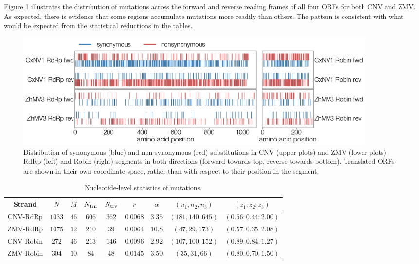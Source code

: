 \documentclass[unnumsec,webpdf,contemporary,large,namedate]{oup-authoring-template}%
\theoremstyle{thmstyleone}%
\theoremstyle{thmstyletwo}%
\theoremstyle{thmstylethree}%
\begin{document}
Figure \ref{fig: 2} illustrates the distribution of mutations across the forward and reverse reading frames
of all four ORFs for both CNV and ZMV. As expected, there is evidence that some regions accumulate mutations more readily than others.
The pattern is consistent with what would be expected from the statistical reductions in the tables.

\begin{figure}
\begin{center}
\includegraphics[width=0.9\textwidth]{narna-diversity.png}
\caption{\label{fig: 2}
Distribution of synonymous (blue) and non-synonymous (red) substitutions in CNV (upper plots) and ZMV (lower plots) RdRp (left) and Robin (right) segments in both directions (forward towards top, reverse towards bottom).
Translated ORFs are shown in their own coordinate space, rather than with respect to their position in the segment.
}
\end{center}
\end{figure}

\begin{table}
\centering
\begin{tabular}{|c|c|c|c|c|c|c|c|c|}
\hline
Strand&$N$&$M$&$N_{\rm trn}$&$N_{\rm trv}$&$r$&$\alpha$&$(n_1,n_2,n_3)$&$(z_1:z_2:z_3)$\\
\hline
CNV-RdRp&$1033$  &$46$ &$606$ &$362$&$0.0068$&$3.35$ &$(181,140,645)$&$(0.56:0.44:2.00)$\\
ZMV-RdRp&$1075$ &$12$&$210$ &$39$& $0.0064$ &$10.8$ &$(47,29,173)$&$(0.57:0.35:2.08)$\\
CNV-Robin&$272$    &$46$ &$213$ &$146$&$0.0096$&$2.92$ &$(107,100,152)$&$(0.89:0.84:1.27)$\\
ZMV-Robin&$304$&$10$&$84$&$48$&$0.0145$&$3.50$&$(35,31,66)$&$(0.80:0.70:1.50)$\\
\hline
\end{tabular}
\caption{
\centering
Nucleotide-level statistics of mutations.
\label{tab: 5.1}}
\end{table}
\end{document}
